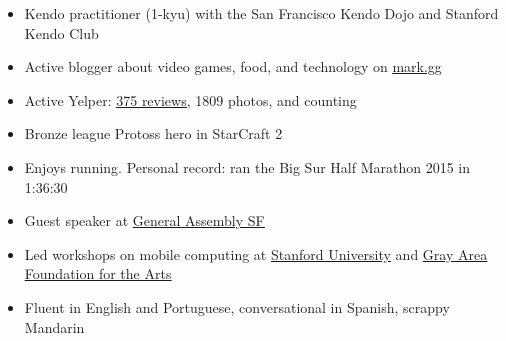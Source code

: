 

\begin{cvparagraph}


\begin{justify}
\begin{itemize}[leftmargin=2ex, nosep]
    \setlength{\parskip}{0pt}
    \setlength\itemsep{0.15em}
    \renewcommand{\labelitemi}{\bullet}
    
\item Kendo practitioner (1-kyu) with the San Francisco Kendo Dojo and Stanford Kendo Club
\item Active blogger about video games, food, and technology on \href{mark.gg}{\underline{mark.gg}}
\item Active Yelper: \href{markcerqueira.yelp.com}{\underline{375 reviews}}, 1809 photos, and counting
\item Bronze league Protoss hero in StarCraft 2
\item Enjoys running. Personal record: ran the Big Sur Half Marathon 2015 in 1:36:30
\item Guest speaker at \href{https://generalassemb.ly/instructors/mark-cerqueira/10476}{\underline{General Assembly SF}}
\item Led workshops on mobile computing at \href{https://ccrma.stanford.edu/workshops/music-and-mobile-computing}{\underline{Stanford University}} and \href{http://main.dev.gaffta.org/?author=81}{\underline{Gray Area Foundation for the Arts}}
\item Fluent in English and Portuguese, conversational in Spanish, scrappy Mandarin

\end{itemize}
\end{justify}

\end{cvparagraph}
